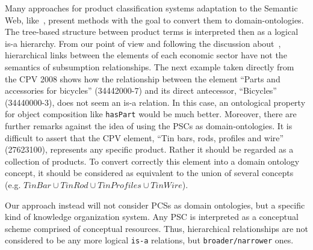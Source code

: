 \begin{itemize}
 
 Many approaches for product classification systems adaptation to the Semantic Web, 
 like~\cite{Lonsdale:2010:ROL:1743778.1744005}, present methods with the goal to convert them to domain-ontologies. 
 The tree-based structure between product terms is interpreted then as a logical is-a hierarchy. 
 From our point of view and following the discussion about~\cite{Hepp:2007:POR:1256315.1256337,Hepp:2006:SWS:1128590.1128683}, hierarchical 
 links between the elements of each economic sector have not the semantics of subsumption relationships. The next example 
 taken directly from the CPV 2008 shows how the relationship between the element ``Parts and accessories for bicycles'' (34442000-7) 
 and its direct antecessor, ``Bicycles'' (34440000-3), does not seem an is-a relation. In this case, an ontological 
 property for object composition like \texttt{hasPart} would be much better. Moreover, there are further 
 remarks against the idea of using the PSCs as domain-ontologies. It is difficult to assert 
 that the CPV element, ``Tin bars, rods, profiles and wire'' (27623100), represents 
 any specific product. Rather it should be regarded as a collection of products. 
 To convert correctly this element into a domain ontology concept, it should be considered 
 as equivalent to the union of several concepts (e.g. $TinBar \cup TinRod \cup TinProfiles \cup TinWire$).
 
 Our approach instead will not consider PCSs as domain ontologies, but a specific kind of knowledge organization system. Any PSC is 
 interpreted as a conceptual scheme comprised of conceptual resources. Thus, hierarchical relationships are not 
 considered to be any more logical \texttt{is-a} relations, but \texttt{broader/narrower} ones. 

\end{itemize}
